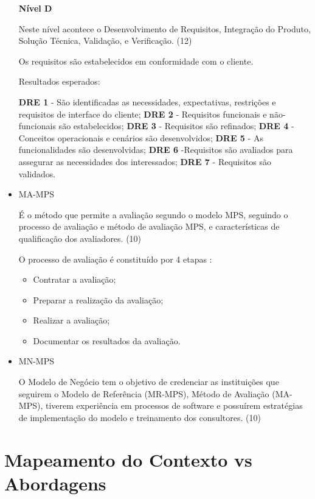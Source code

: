 \begin{itemize}
\textbf{Nível D}

Neste nível acontece o Desenvolvimento de Requisitos, Integração do Produto, Solução Técnica, Validação, e Verificação. (12)

Os requisitos são estabelecidos em conformidade com o cliente.

Resultados esperados:

\textbf{DRE 1} - São identificadas as necessidades, expectativas, restrições e requisitos de interface do cliente;
\textbf{DRE 2} - Requisitos funcionais e não-funcionais são estabelecidos;
\textbf{DRE 3} - Requisitos são refinados;
\textbf{DRE 4} - Conceitos operacionais e cenários são desenvolvidos;
\textbf{DRE 5} - As funcionalidades são desenvolvidas;
\textbf{DRE 6} -Requisitos são avaliados para assegurar as necessidades dos interessados;
\textbf{DRE 7} - Requisitos são validados.

\item {MA-MPS}

É o método que permite a avaliação segundo o modelo MPS, seguindo o processo de avaliação e método de avaliação MPS, e características de qualificação dos avaliadores. (10)

O processo de avaliação é constituído por 4 etapas :

\begin{itemize}
\item Contratar a avaliação;
\item Preparar a realização da avaliação;
\item Realizar a avaliação;
\item Documentar os resultados da avaliação.
\end{itemize}

\item {MN-MPS}

O Modelo de Negócio tem o objetivo de credenciar as instituições que seguirem o Modelo de Referência (MR-MPS), Método de Avaliação (MA-MPS), tiverem experiência em processos de software e possuírem estratégias de implementação do modelo e treinamento dos consultores. (10)


\end{itemize}



\section {Mapeamento do Contexto vs Abordagens}
